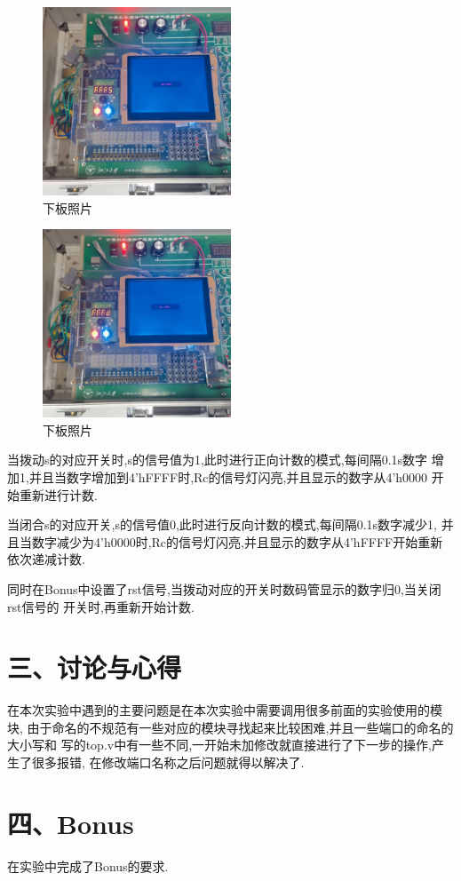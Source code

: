 \documentclass{article}
\begin{document}
    \begin{figure}[H]
    \centering
    \includegraphics[width=0.5\textwidth]{lab10p/12.jpg}
    \caption{\label{Lab10}下板照片}
    \end{figure} 

    \begin{figure}[H]
    \centering
    \includegraphics[width=0.5\textwidth]{lab10p/13.jpg}
    \caption{\label{Lab10}下板照片}
    \end{figure} 

当拨动s的对应开关时,s的信号值为1,此时进行正向计数的模式,每间隔0.1s数字
增加1,并且当数字增加到4'hFFFF时,Rc的信号灯闪亮,并且显示的数字从4'h0000
开始重新进行计数.

当闭合s的对应开关,s的信号值0,此时进行反向计数的模式,每间隔0.1s数字减少1,
并且当数字减少为4'h0000时,Rc的信号灯闪亮,并且显示的数字从4'hFFFF开始重新
依次递减计数.

同时在Bonus中设置了rst信号,当拨动对应的开关时数码管显示的数字归0,当关闭rst信号的
开关时,再重新开始计数.

\section*{三、讨论与心得}
在本次实验中遇到的主要问题是在本次实验中需要调用很多前面的实验使用的模块,
由于命名的不规范有一些对应的模块寻找起来比较困难,并且一些端口的命名的大小写和
写的top.v中有一些不同,一开始未加修改就直接进行了下一步的操作,产生了很多报错,
在修改端口名称之后问题就得以解决了.



\section*{四、Bonus}
在实验中完成了Bonus的要求.
\end{document}
